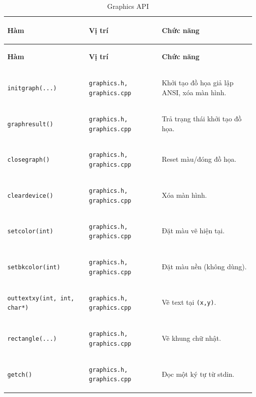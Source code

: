 \documentclass[14pt,a4paper]{report}
\begin{document}
\begin{longtable}{|>{\bfseries\raggedright\arraybackslash}p{}|
                   >{\bfseries\raggedright\arraybackslash}p{2.8cm}|
                   >{\raggedright\arraybackslash}p{}|}
\end{longtable}






\renewcommand{\arraystretch}{1.15}
\setlength{\tabcolsep}{6pt}

\begin{longtable}{|>{\bfseries\raggedright\arraybackslash}p{}|
                   >{\bfseries\raggedright\arraybackslash}p{2.8cm}|
                   >{\raggedright\arraybackslash}p{}|}
\caption{Graphics API}\\
\hline
\rowcolor{headergray}
\color{white}\textbf{Hàm} & \color{white}\textbf{Vị trí} & \color{white}\textbf{Chức năng} \\
\hline
\endfirsthead

\hline
\rowcolor{headergray}
\color{white}\textbf{Hàm} & \color{white}\textbf{Vị trí} & \color{white}\textbf{Chức năng} \\
\hline
\endhead

\hline
\endfoot

\hline
\endlastfoot

\texttt{initgraph(...)} &
\texttt{graphics.h, graphics.cpp} &
Khởi tạo đồ họa giả lập ANSI, xóa màn hình.\\ \hline

\texttt{graphresult()} &
\texttt{graphics.h, graphics.cpp} &
Trả trạng thái khởi tạo đồ họa.\\ \hline

\texttt{closegraph()} &
\texttt{graphics.h, graphics.cpp} &
Reset màu/đóng đồ họa.\\ \hline

\texttt{cleardevice()} &
\texttt{graphics.h, graphics.cpp} &
Xóa màn hình.\\ \hline

\texttt{setcolor(int)} &
\texttt{graphics.h, graphics.cpp} &
Đặt màu vẽ hiện tại.\\ \hline

\texttt{setbkcolor(int)} &
\texttt{graphics.h, graphics.cpp} &
Đặt màu nền (không dùng).\\ \hline

\texttt{outtextxy(int, int, char*)} &
\texttt{graphics.h, graphics.cpp} &
Vẽ text tại \texttt{(x,y)}.\\ \hline

\texttt{rectangle(...)} &
\texttt{graphics.h, graphics.cpp} &
Vẽ khung chữ nhật.\\ \hline

\texttt{getch()} &
\texttt{graphics.h, graphics.cpp} &
Đọc một ký tự từ stdin.\\ \hline

\end{longtable}
\end{document}
